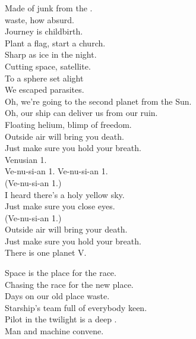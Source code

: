 Made of junk from the . \\
 waste, how absurd. \\
Journey is childbirth. \\
Plant a flag, start a church. \\
Sharp as ice in the night. \\
Cutting space, satellite. \\
To a sphere set alight \\
We escaped parasites. \\

Oh, we're going to the second planet from the Sun. \\
Oh, our ship can deliver us from our ruin. \\

Floating helium, blimp of freedom. \\
Outside air will bring you death. \\
Just make sure you hold your breath. \\
Venusian 1. \\

Ve-nu-si-an 1. Ve-nu-si-an 1. \\

(Ve-nu-si-an 1.) \\
I heard there's a holy yellow sky. \\
Just make sure you close eyes. \\

(Ve-nu-si-an 1.) \\
Outside air will bring your death. \\
Just make sure you hold your breath. \\

There is one planet V. \\





Space is the place for the  race. \\
Chasing the race for the new place. \\
Days on our old place waste. \\
Starship's team full of everybody keen. \\
Pilot in the twilight is a deep . \\
Man and machine convene. \\

